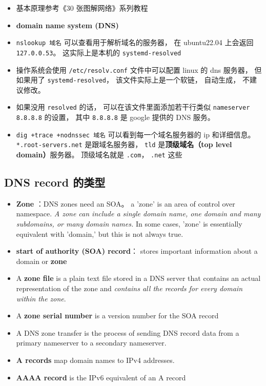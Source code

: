 
\begin{itemize}
\item 基本原理参考《30 张图解网络》系列教程
\item \textbf{domain name system (DNS)}
\item \verb|nslookup 域名| 可以查看用于解析域名的服务器， 在 ubuntu22.04 上会返回 \verb|127.0.0.53|。 这实际上是本机的 \verb|systemd-resolved|
\item 操作系统会使用 \verb|/etc/resolv.conf| 文件中可以配置 linux 的 dns 服务器， 但如果用了 \verb|systemd-resolved|， 该文件实际上是一个软链， 自动生成， 不建议修改。
\item 如果没用 \verb|resolved| 的话， 可以在该文件里面添加若干行类似 \verb|nameserver 8.8.8.8| 的设置， 其中 \verb|8.8.8.8| 是 google 提供的 DNS 服务。
\item \verb|dig +trace +nodnssec 域名| 可以看到每一个域名服务器的 ip 和详细信息。 \verb|*.root-servers.net| 是跟域名服务器， \verb|tld| 是\textbf{顶级域名（top level domain）}服务器。 顶级域名就是 \verb|.com|， \verb|.net| 这些
\end{itemize}

\subsection{DNS record 的类型}
\begin{itemize}
\item \textbf{Zone} ：DNS zones need an SOA。 a 'zone' is an area of control over namespace. \textsl{A zone can include a single domain name, one domain and many subdomains, or many domain names.} In some cases, 'zone' is essentially equivalent with 'domain,' but this is not always true.
\item \textbf{start of authority (SOA) record}： stores important information about a domain or \textbf{zone}
\item A \textbf{zone file} is a plain text file stored in a DNS server that contains an actual representation of the zone and \textsl{contains all the records for every domain within the zone}.
\item A \textbf{zone serial number} is a version number for the SOA record
\item A DNS zone transfer is the process of sending DNS record data from a primary nameserver to a secondary nameserver.
\item \textbf{A records} map domain names to IPv4 addresses.
\item \textbf{AAAA record} is the IPv6 equivalent of an A record
\end{itemize}
